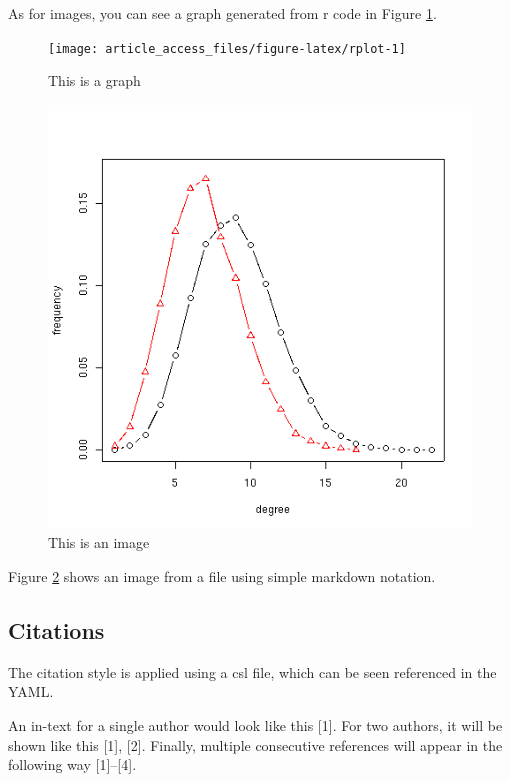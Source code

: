 \documentclass[]{latex/ieeeaccess}
\begin{document}
As for images, you can see a graph generated from r code in Figure
\ref{fig:rplot}.

\begin{figure}

{\centering \texttt{[image: article\_access\_files/figure-latex/rplot-1]} 

}

\caption{This is a graph}\label{fig:rplot}
\end{figure}

\begin{figure}
\centering
\includegraphics{images/graph.png}
\caption{This is an image\label{fimage}}
\end{figure}

Figure \ref{fimage} shows an image from a file using simple markdown
notation.

\hypertarget{citations}{%
\subsection{Citations}\label{citations}}

The citation style is applied using a csl file, which can be seen
referenced in the YAML.

An in-text for a single author would look like this {[}1{]}. For two
authors, it will be shown like this {[}1{]}, {[}2{]}. Finally, multiple
consecutive references will appear in the following way
{[}1{]}--{[}4{]}.
\end{document}
